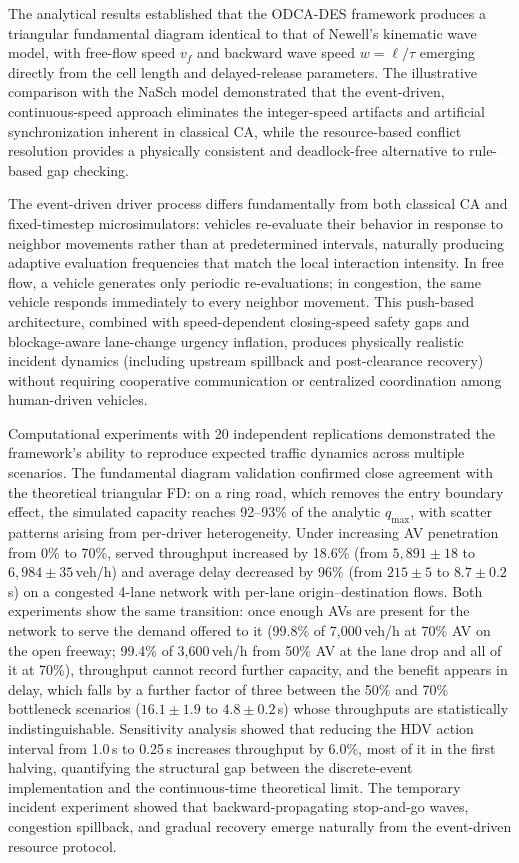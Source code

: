 \documentclass[review,number]{elsarticle}
\begin{document}
The analytical results established that the ODCA-DES framework produces a triangular fundamental diagram identical to that of Newell's kinematic wave model, with free-flow speed $v_f$ and backward wave speed $w = \ell/\tau$ emerging directly from the cell length and delayed-release parameters. The illustrative comparison with the NaSch model demonstrated that the event-driven, continuous-speed approach eliminates the integer-speed artifacts and artificial synchronization inherent in classical CA, while the resource-based conflict resolution provides a physically consistent and deadlock-free alternative to rule-based gap checking.

The event-driven driver process differs fundamentally from both classical CA and fixed-timestep microsimulators: vehicles re-evaluate their behavior in response to neighbor movements rather than at predetermined intervals, naturally producing adaptive evaluation frequencies that match the local interaction intensity. In free flow, a vehicle generates only periodic re-evaluations; in congestion, the same vehicle responds immediately to every neighbor movement. This push-based architecture, combined with speed-dependent closing-speed safety gaps and blockage-aware lane-change urgency inflation, produces physically realistic incident dynamics (including upstream spillback and post-clearance recovery) without requiring cooperative communication or centralized coordination among human-driven vehicles.

Computational experiments with 20 independent replications demonstrated the framework's ability to reproduce expected traffic dynamics across multiple scenarios. The fundamental diagram validation confirmed close agreement with the theoretical triangular FD: on a ring road, which removes the entry boundary effect, the simulated capacity reaches 92--93\% of the analytic $q_{\max}$, with scatter patterns arising from per-driver heterogeneity. Under increasing AV penetration from 0\% to 70\%, served throughput increased by 18.6\% (from $5{,}891 \pm 18$ to $6{,}984 \pm 35$\,veh/h) and average delay decreased by 96\% (from $215 \pm 5$ to $8.7 \pm 0.2$\,s) on a congested 4-lane network with per-lane origin--destination flows. Both experiments show the same transition: once enough AVs are present for the network to serve the demand offered to it (99.8\% of 7{,}000\,veh/h at 70\% AV on the open freeway; 99.4\% of 3{,}600\,veh/h from 50\% AV at the lane drop and all of it at 70\%), throughput cannot record further capacity, and the benefit appears in delay, which falls by a further factor of three between the 50\% and 70\% bottleneck scenarios ($16.1 \pm 1.9$ to $4.8 \pm 0.2$\,s) whose throughputs are statistically indistinguishable. Sensitivity analysis showed that reducing the HDV action interval from 1.0\,s to 0.25\,s increases throughput by 6.0\%, most of it in the first halving, quantifying the structural gap between the discrete-event implementation and the continuous-time theoretical limit. The temporary incident experiment showed that backward-propagating stop-and-go waves, congestion spillback, and gradual recovery emerge naturally from the event-driven resource protocol.
\end{document}
